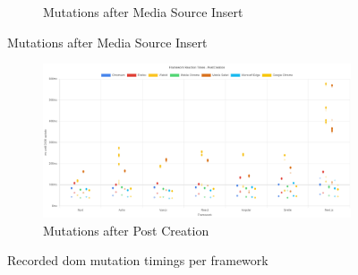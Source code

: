 \documentclass[a4paper, 10pt]{article}
\begin{document}
\begin{figure}[ht!]
\begin{subfigure}{0.9\linewidth}
\begin{center}
    \end{center}
    \caption{Mutations after Media Source Insert}\label{subfig:PW:mediaSourceInsert}
  \end{subfigure}
\end{figure}
\begin{figure}[ht!]\ContinuedFloat
  \begin{subfigure}{0.9\linewidth}
    \begin{center}
      \includegraphics[width=\linewidth, keepaspectratio]{img/playwright-results/userActions_byUserAction/postCreation.png}
    \end{center}
    \caption{Mutations after Post Creation}\label{subfig:PW:postCreation}
  \end{subfigure}
  \caption{Recorded \acrshort{dom} mutation timings per framework}
  \label{fig:playwrightResults:frameworks}
\end{figure}
\end{document}
